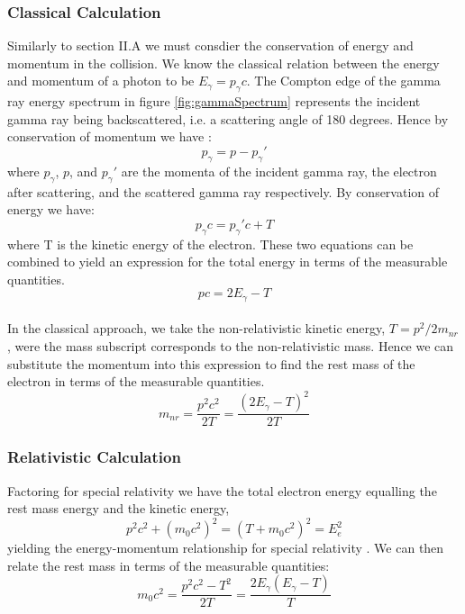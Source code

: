 \documentclass[%
reprint,
amsmath,amssymb,
aps,
floatfix
]{revtex4-2}
\begin{document}
			\subsubsection{Classical Calculation}
			Similarly to section II.A we must consdier the conservation of energy and momentum in the collision. We know the classical relation between the energy and momentum of a photon to be $E_\gamma = p_\gamma c$. The Compton edge of the gamma ray energy spectrum in figure \ref{fig:gammaSpectrum} represents the incident gamma ray being backscattered, i.e. a scattering angle of 180 degrees. Hence by conservation of momentum we have \cite{manual2}:
			\begin{equation}
				p_\gamma = p - p_\gamma '
			\end{equation}where $p_\gamma$, $p$, and $p_\gamma '$ are the momenta of the incident gamma ray, the electron after scattering, and the scattered gamma ray respectively. By conservation of energy we have:
			\begin{equation}
				p_\gamma c = p_\gamma 'c + T
			\end{equation}where T is the kinetic energy of the electron. These two equations can be combined to yield an expression for the total energy in terms of the measurable quantities.
			\begin{equation}
				pc = 2 E_\gamma - T
			\end{equation}\\
			
			In the classical approach, we take the non-relativistic kinetic energy, $T = p^2 / 2m_{nr}$, were the mass subscript corresponds to the non-relativistic mass. Hence we can substitute the momentum into this expression to find the rest mass of the electron in terms of the measurable quantities.
			\begin{equation}
				m_{nr} = \frac{p^2 c^2}{2T} = \frac{(2 E_\gamma - T)^2}{2T}
				\label{eq:classical}
			\end{equation}
			
			\subsubsection{Relativistic Calculation}
			Factoring for special relativity we have the total electron energy equalling the rest mass energy and the kinetic energy,
			\begin{equation}
				p^2 c^2 + (m_0 c^2)^2 = (T + m_0 c^2)^2 = E_e^2
			\end{equation}yielding the energy-momentum relationship for special relativity \cite{manual2}. We can then relate the rest mass in terms of the measurable quantities:
			\begin{equation}
				m_0 c^2 = \frac{p^2 c^2 - T^2}{2T} = \frac{2 E_\gamma (E_\gamma -T)}{T}
				\label{eq:relativistic}
			\end{equation}
		
\end{document}
